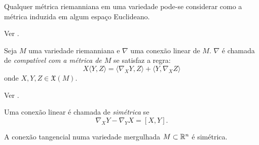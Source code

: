 \begin{teorema}
	Qualquer métrica riemanniana em uma variedade pode-se considerar como a métrica induzida em algum espaço Euclideano.
\end{teorema}

\begin{demonstracao}
	Ver \cite[Theorem 3]{Nash1956}.
\end{demonstracao}

\begin{proposicao}
	Seja $M$ uma variedade riemanniana e
	$\nabla$ uma conexão linear de $M$.
	$\nabla$ é chamada de \emph{compatível com a métrica de $M$} se satisfaz a regra:
	\begin{equation*}
		X \langle Y,Z \rangle = \langle \nabla_X Y, Z \rangle + \langle Y, \nabla_X Z \rangle
	\end{equation*}
	onde $X,Y,Z \in \mathfrak{X}(M)$.
\end{proposicao}

\begin{demonstracao}
	Ver \cite[Cap. 2, corolário 3.3]{Carmo1988}.
\end{demonstracao}


\begin{definicao}
	Uma conexão linear é chamada de \emph{simétrica} se
	\begin{equation*}
		\nabla_X Y - \nabla_Y X = [X,Y].
	\end{equation*}
\end{definicao}

\begin{lema}\label{conexao-tangencial-simetrica}
	A conexão tangencial numa variedade mergulhada $M \subset \mathbb{R}^n$ é simétrica.
\end{lema}

